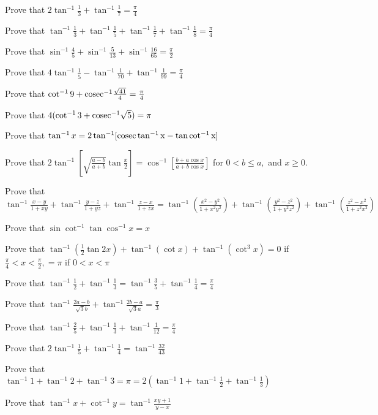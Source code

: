 \item Prove that $2\tan^{-1}\frac{1}{3} + \tan^{-1}\frac{1}{7} = \frac{\pi}{4}$
\item Prove that $\tan^{-1}\frac{1}{3} + \tan^{-1}\frac{1}{5} + \tan^{-1}\frac{1}{7} + \tan^{-1}\frac{1}{8} = \frac{\pi}{4}$
\item Prove that $\sin^{-1}\frac{4}{5} + \sin^{-1}\frac{5}{13} + \sin^{-1}\frac{16}{65} = \frac{\pi}{2}$
\item Prove that $4\tan^{-1}\frac{1}{5} - \tan^{-1}\frac{1}{70} + \tan^{-1}\frac{1}{99} = \frac{\pi}{4}$
\item Prove that $\cot^{-1}9 + \rm cosec^{-1}\frac{\sqrt{41}}{4} = \frac{\pi}{4}$
\item Prove that $4(\cot^{-1}3 + \rm cosec^{-1}\sqrt{5}) = \pi$
\item Prove that $\tan^{-1}x = 2\tan^{-1}[\rm cosec\tan^{-1}x - \tan\cot^{-1}x]$
\item Prove that $2\tan^{-1}\left[\sqrt{\frac{a - b}{a + b}}\tan\frac{x}{2}\right] = \cos^{-1}\left[\frac{b + a\cos x}{a +
    b\cos x}\right]$ for $0<b\leq a,$ and $x\geq 0.$
\item Prove that $\tan^{-1}\frac{x - y}{1 + xy} + \tan^{-1}\frac{y - z}{1 + yz} + \tan^{-1}\frac{z - x}{1 + zx} =
    \tan^{-1}\left(\frac{x^2 - y^2}{1 + x^2y^2}\right) + \tan^{-1}\left(\frac{y^2 - z^2}{1 + y^2z^2}\right) +
    \tan^{-1}\left(\frac{z^2 - x^2}{1 + z^2x^2}\right)$
\item Prove that $\sin\cot^{-1}\tan\cos^{-1}x = x$
\item Prove that $\tan^{-1}\left(\frac{1}{2}\tan 2x\right) + \tan^{-1}(\cot x) +\tan^{-1}(\cot^3x) = 0$ if
    $\frac{\pi}{4}< x < \frac{\pi}{2}, = \pi$ if $0<x<\pi$
\item Prove that $\tan^{-1}\frac{1}{2} + \tan^{-1}\frac{1}{3} = \tan^{-1}\frac{3}{5} + \tan^{-1}\frac{1}{4} = \frac{\pi}{4}$
\item Prove that $\tan^{-1}\frac{2a - b}{\sqrt{3}b} + \tan^{-1}\frac{2b - a}{\sqrt{3}a} = \frac{\pi}{3}$
\item Prove that $\tan^{-1}\frac{2}{5} + \tan^{-1}\frac{1}{3} + \tan^{-1}\frac{1}{12} = \frac{\pi}{4}$
\item Prove that $2\tan^{-1}\frac{1}{5} + \tan^{-1}\frac{1}{4} = \tan^{-1}\frac{32}{43}$
\item Prove that $\tan^{-1}1 + \tan^{-1}2 + \tan^{-1}3 = \pi = 2\left(\tan^{-1}1 + \tan^{-1}\frac{1}{2} +
    \tan^{-1}\frac{1}{3}\right)$
\item Prove that $\tan^{-1}x + \cot^{-1}y = \tan^{-1}\frac{xy + 1}{y - x}$

